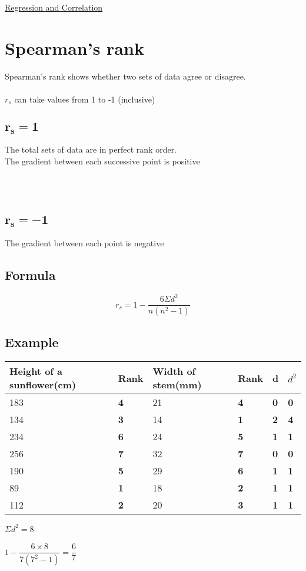 \documentclass{article}[18pt]
\begin{document}
\begin{center}
\underline{\huge Regression and Correlation}
\end{center}
\section{Spearman's rank}
Spearman's rank shows whether two sets of data agree or disagree.\\
\\
$r_s$ can take values from 1 to -1 (inclusive)
\subsection{$\mathbf{r_s=1}$}
The total sets of data are in perfect rank order.\\
The gradient between each successive point is positive\\
\\
\\
\subsection{$\mathbf{r_s=-1}$}
The gradient between each point is negative\\
\subsection{Formula}
$$r_s=1-\dfrac{6\Sigma d^2}{n(n^2-1)}$$
\subsection{Example}
\begin{tabularx}{\textwidth}{|X|X|X|X|X|X|}
\hline
Height of a sunflower(cm)&Rank&Width of stem(mm)&Rank&d&$d^2$\\
\hline
183&\textbf{4}&21&\textbf{4}&\textbf{0}&\textbf{0}\\
\hline
134&\textbf{3}&14&\textbf{1}&\textbf{2}&\textbf{4}\\
\hline
234&\textbf{6}&24&\textbf{5}&\textbf{1}&\textbf{1}\\
\hline
256&\textbf{7}&32&\textbf{7}&\textbf{0}&\textbf{0}\\
\hline
190&\textbf{5}&29&\textbf{6}&\textbf{1}&\textbf{1}\\
\hline
89&\textbf{1}&18&\textbf{2}&\textbf{1}&\textbf{1}\\
\hline
112&\textbf{2}&20&\textbf{3}&\textbf{1}&\textbf{1}\\
\hline
\end{tabularx}
$\Sigma d^2=8$\\
\\
$1-\dfrac{6\times8}{7(7^2-1)}=\dfrac{6}{7}$
\end{document}
